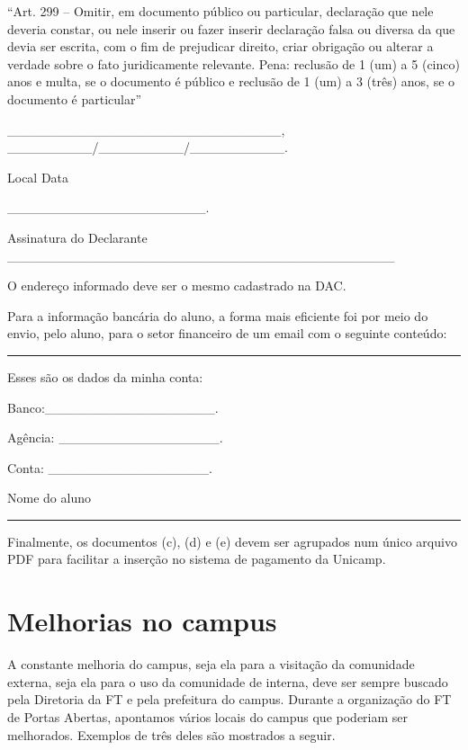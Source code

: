 \documentclass[
  letterpaper,
  DIV=11,
  numbers=noendperiod]{scrreprt}
\begin{document}
``Art. 299 -- Omitir, em documento público ou particular, declaração que
nele deveria constar, ou nele inserir ou fazer inserir declaração falsa
ou diversa da que devia ser escrita, com o fim de prejudicar direito,
criar obrigação ou alterar a verdade sobre o fato juridicamente
relevante. Pena: reclusão de 1 (um) a 5 (cinco) anos e multa, se o
documento é público e reclusão de 1 (um) a 3 (três) anos, se o documento
é particular''

\_\_\_\_\_\_\_\_\_\_\_\_\_\_\_\_\_\_\_\_\_\_\_\_\_\_\_\_\_,
\_\_\_\_\_\_\_\_\_/\_\_\_\_\_\_\_\_\_/\_\_\_\_\_\_\_\_\_\_.

Local Data

\_\_\_\_\_\_\_\_\_\_\_\_\_\_\_\_\_\_\_\_\_.

Assinatura do Declarante
\_\_\_\_\_\_\_\_\_\_\_\_\_\_\_\_\_\_\_\_\_\_\_\_\_\_\_\_\_\_\_\_\_\_\_\_\_\_\_\_\_

O endereço informado deve ser o mesmo cadastrado na DAC.

Para a informação bancária do aluno, a forma mais eficiente foi por meio
do envio, pelo aluno, para o setor financeiro de um email com o seguinte
conteúdo:

\begin{center}\rule{0.5\linewidth}{0.5pt}\end{center}

Esses são os dados da minha conta:

Banco:\_\_\_\_\_\_\_\_\_\_\_\_\_\_\_\_\_\_.

Agência: \_\_\_\_\_\_\_\_\_\_\_\_\_\_\_\_\_.

Conta: \_\_\_\_\_\_\_\_\_\_\_\_\_\_\_\_\_.

Nome do aluno

\begin{center}\rule{0.5\linewidth}{0.5pt}\end{center}

Finalmente, os documentos (c), (d) e (e) devem ser agrupados num único
arquivo PDF para facilitar a inserção no sistema de pagamento da
Unicamp.

\section{Melhorias no campus}\label{melhorias-no-campus}

A constante melhoria do campus, seja ela para a visitação da comunidade
externa, seja ela para o uso da comunidade de interna, deve ser sempre
buscado pela Diretoria da FT e pela prefeitura do campus. Durante a
organização do FT de Portas Abertas, apontamos vários locais do campus
que poderiam ser melhorados. Exemplos de três deles são mostrados a
seguir.
\end{document}
